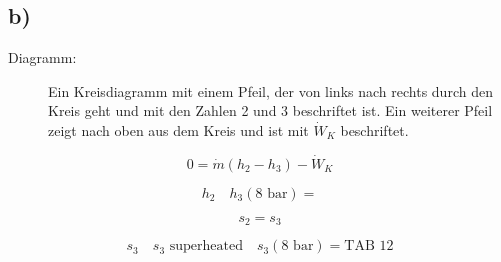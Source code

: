 

\subsection*{b)}

\begin{description}
    \item[Diagramm:] Ein Kreisdiagramm mit einem Pfeil, der von links nach rechts durch den Kreis geht und mit den Zahlen 2 und 3 beschriftet ist. Ein weiterer Pfeil zeigt nach oben aus dem Kreis und ist mit \( \dot{W}_K \) beschriftet.
\end{description}

\[
0 = \dot{m} (h_2 - h_3) - \dot{W}_K
\]

\[
h_2 \quad h_3(8 \text{ bar}) =
\]

\[
s_2 = s_3
\]

\[
s_3 \quad s_3 \text{ superheated} \quad s_3(8 \text{ bar}) = \text{TAB 12}
\]